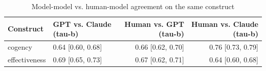 \begin{table}[htbp]
\centering
\small
\caption{Model-model vs. human-model agreement on the same construct}
\label{tab:S1_model_model}
\begin{tabular}{llrr}
\toprule
Construct & GPT vs. Claude (tau-b) & Human vs. GPT (tau-b) & Human vs. Claude (tau-b) \\
\midrule
cogency & 0.64 [0.60, 0.68] & 0.66 [0.62, 0.70] & 0.76 [0.73, 0.79] \\
effectiveness & 0.69 [0.65, 0.73] & 0.67 [0.62, 0.71] & 0.64 [0.60, 0.68] \\
\bottomrule
\end{tabular}
\end{table}
